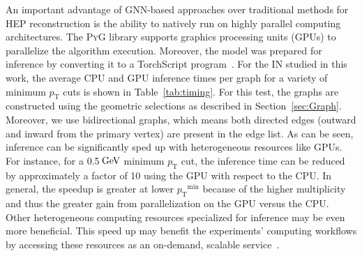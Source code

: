 \documentclass[twocolumn]{svjour3}
\newcommand{\pt}{\ensuremath{p_{\mathrm{T}}}\xspace}
\newcommand{\GeV}{\ensuremath{\,\text{Ge\hspace{-.08em}V}}\xspace}
\begin{document}
An important advantage of GNN-based approaches over traditional methods for HEP reconstruction is the ability to natively run on highly parallel computing architectures.
The \textsc{PyG} library supports graphics processing units (GPUs) to parallelize the algorithm execution.
Moreover, the model was prepared for inference by converting it to a TorchScript program~\cite{torchscript}.
For the IN studied in this work, the average CPU and GPU inference times per graph for a variety of minimum $\pt$ cuts is shown in Table~\ref{tab:timing}.
For this test, the graphs are constructed using the geometric selections as described in Section~\ref{sec:Graph}. 
Moreover, we use bidirectional graphs, which means both directed edges (outward and inward from the primary vertex) are present in the edge list.
As can be seen, inference can be significantly sped up with heterogeneous resources like GPUs.
For instance, for a 0.5\GeV minimum \pt cut, the inference time can be reduced by approximately a factor of 10 using the GPU with respect to the CPU.
In general, the speedup is greater at lower $\pt^\mathrm{min}$ because of the higher multiplicity and thus the greater gain from parallelization on the GPU versus the CPU.
Other heterogeneous computing resources specialized for inference may be even more beneficial. 
This speed up may benefit the experiments' computing workflows by accessing these resources as an on-demand, scalable service~\cite{Krupa:2020bwg,Rankin:2020usv,Wang:2020fjr}.
\end{document}
